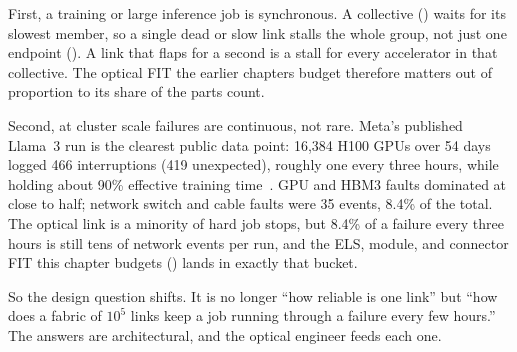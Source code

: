 First, a training or large inference job is synchronous. A collective
() waits for its slowest member, so a single dead or slow
link stalls the whole group, not just one endpoint ().
A link that flaps for a second is a stall for every accelerator in that collective.
The optical FIT the earlier chapters budget therefore matters out of proportion to
its share of the parts count.

Second, at cluster scale failures are continuous, not rare. Meta's published
Llama~3 run is the clearest public data point: 16{,}384 H100 GPUs over 54 days
logged 466 interruptions (419 unexpected), roughly one every three hours, while
holding about 90\% effective training time~. GPU and HBM3
faults dominated at close to half; network switch and cable faults were 35 events,
8.4\% of the total. The optical link is a minority of hard job stops, but 8.4\% of
a failure every three hours is still tens of network events per run, and the ELS,
module, and connector FIT this chapter budgets
() lands in exactly that bucket.

So the design question shifts. It is no longer ``how reliable is one link'' but
``how does a fabric of $10^5$ links keep a job running through a failure every few
hours.'' The answers are architectural, and the optical engineer feeds each one.

